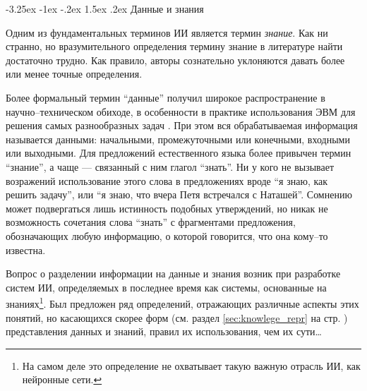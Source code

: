 \documentclass[12pt, openany, twoside]{book} %
\makeatletter
\renewcommand\section{\@startsection {section}{1}{\z@}%
                                   {-3.25ex \@plus -1ex \@minus -.2ex}%
                                   {1.5ex \@plus.2ex}%
                                   {\normalfont\large\bfseries}}
\makeatother
\begin{document}
\section{Данные и знания}

Одним из фундаментальных терминов ИИ является термин {\em знание}. Как ни странно, но вразумительного определения термину знание в литературе най\-ти достаточно трудно. Как правило, авторы сознательно уклоняются давать более или менее точные определения.

Более формальный термин ``данные'' получил широкое распространение в научно--техническом обиходе, в особенности в практике использования ЭВМ для решения самых разнообразных задач \cite{AIDictionary}. При этом вся обрабатываемая информация называется данными: началь\-ны\-ми, промежуточными или конечными, входными или выходными. Для предложений естественного языка более привычен термин ``знание'', а чаще --- связанный с ним глагол ``знать''. Ни у кого не вызывает возражений использование этого слова в предложениях вроде ``я знаю, как решить задачу'', или ``я знаю, что вчера Петя встречался с Наташей''. Сомнению может подвергаться лишь истинность подобных утверждений, но никак не возможность сочетания слова ``знать'' с фрагментами предложения, обозначающих любую информацию, о которой говорится, что она кому--то известна.

Вопрос о разделении информации на данные и знания возник при разработке систем ИИ, определяемых в последнее время как системы, основанные на знаниях\footnote{На самом деле это определение не охватывает такую важную отрасль ИИ, как нейронные сети.}. Был предложен ряд определений, отражающих различные аспекты этих понятий, но касающихся скорее форм (см. раздел \ref{sec:knowlege_repr} на стр. \pageref{sec:knowlege_repr}) представления данных и знаний, правил их использования, чем их сути\ldots
\end{document}
